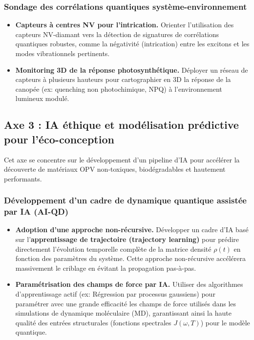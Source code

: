 \documentclass[12pt, a4paper]{article}
\begin{document}
\subsubsection{Sondage des corrélations quantiques système-environnement}
\begin{itemize}
    \item \textbf{Capteurs à centres NV pour l'intrication.} Orienter l'utilisation des capteurs NV-diamant vers la détection de signatures de corrélations quantiques robustes, comme la négativité (intrication) entre les excitons et les modes vibrationnels pertinents.

    \item \textbf{Monitoring 3D de la réponse photosynthétique.} Déployer un réseau de capteurs à plusieurs hauteurs pour cartographier en 3D la réponse de la canopée (ex: quenching non photochimique, NPQ) à l'environnement lumineux modulé.
\end{itemize}

\subsection{Axe 3 : IA éthique et modélisation prédictive pour l'éco-conception}

Cet axe se concentre sur le développement d'un pipeline d'IA pour accélérer la découverte de matériaux OPV non-toxiques, biodégradables et hautement performants.

\subsubsection{Développement d'un cadre de dynamique quantique assistée par IA (AI-QD)}
\begin{itemize}
    \item \textbf{Adoption d'une approche non-récursive.} Développer un cadre d'IA basé sur l'\textbf{apprentissage de trajectoire (trajectory learning)} pour prédire directement l'évolution temporelle complète de la matrice densité $\rho(t)$ en fonction des paramètres du système. Cette approche non-récursive accélérera massivement le criblage en évitant la propagation pas-à-pas.

    \item \textbf{Paramétrisation des champs de force par IA.} Utiliser des algorithmes d'apprentissage actif (ex: Régression par processus gaussiens) pour paramétrer avec une grande efficacité les champs de force utilisés dans les simulations de dynamique moléculaire (MD), garantissant ainsi la haute qualité des entrées structurales (fonctions spectrales $J(\omega, T)$) pour le modèle quantique.
\end{itemize}
\end{document}
